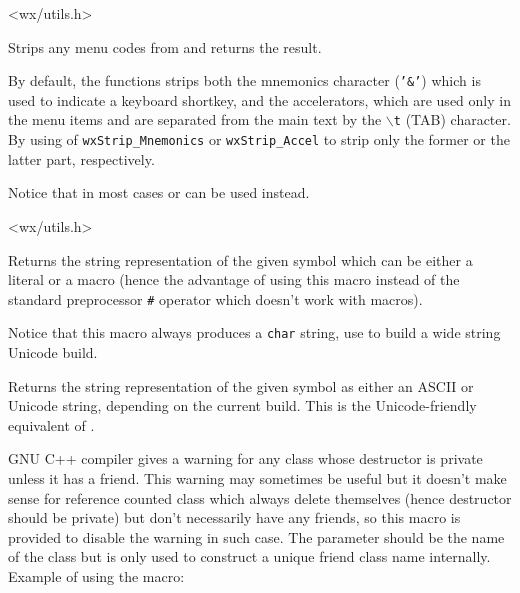 <wx/utils.h>


\label{wxstripmenucodes}


Strips any menu codes from  and returns the result.

By default, the functions strips both the mnemonics character (\texttt{'\&'})
which is used to indicate a keyboard shortkey, and the accelerators, which are
used only in the menu items and are separated from the main text by the
\texttt{$\backslash$t} (TAB) character. By using  of
\texttt{wxStrip\_Mnemonics} or \texttt{wxStrip\_Accel} to strip only the former
or the latter part, respectively.

Notice that in most cases
 or
 can be used instead.


<wx/utils.h>


\label{wxstringize}


Returns the string representation of the given symbol which can be either a
literal or a macro (hence the advantage of using this macro instead of the
standard preprocessor \texttt{\#} operator which doesn't work with macros).

Notice that this macro always produces a \texttt{char} string, use 
 to build a wide string Unicode build.




\label{wxstringizet}


Returns the string representation of the given symbol as either an ASCII or
Unicode string, depending on the current build. This is the Unicode-friendly
equivalent of .


\label{wxsuppressgccprivatedtorwarning}


GNU C++ compiler gives a warning for any class whose destructor is private
unless it has a friend. This warning may sometimes be useful but it doesn't
make sense for reference counted class which always delete themselves (hence
destructor should be private) but don't necessarily have any friends, so this
macro is provided to disable the warning in such case. The  parameter
should be the name of the class but is only used to construct a unique friend
class name internally. Example of using the macro:

